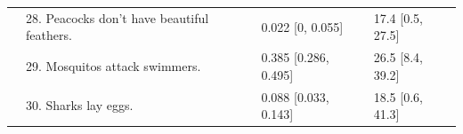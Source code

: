 \documentclass[12pt,letterpaper]{article}
\begin{document}
\begin{table}[h]
\begin{tabular}{| l | l | p{3.5cm} | p{3.5cm} |}
                                              & 28. Peacocks don't have beautiful feathers.                       &0.022 [0, 0.055] & 17.4 [0.5, 27.5]\\                                              
                                               & 29. Mosquitos attack swimmers.       &0.385 [0.286, 0.495] & 26.5 [8.4, 39.2]\\
			                         & 30. Sharks lay eggs.       &0.088 [0.033, 0.143] & 18.5 [0.6, 41.3]\\
\hline

\end{tabular}

\label{tab:expt1}
\end{table}


    
\end{document}

